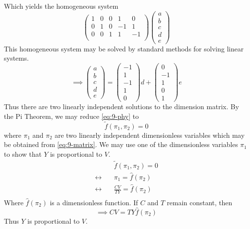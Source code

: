 \documentclass[12pt]{article}
\begin{document}
  Which yields the homogeneous system
  \begin{equation*}
    \begin{pmatrix}
      1 & 0 & 0 & 1 & 0 \\
      0 & 1 & 0 & -1 & 1 \\
      0 & 0 & 1 & 1 & -1 \\
    \end{pmatrix}
    \begin{pmatrix}
      a \\ b \\ c \\ d \\ e
    \end{pmatrix}
  \end{equation*}
  This homogeneous system may be solved by standard methods for solving linear
  systems.
  \begin{equation}
    \label{eq:9-matrix}
    \implies
    \begin{pmatrix}
      a \\ b \\ c \\ d \\ e
    \end{pmatrix}
    =
    \begin{pmatrix}
      -1 \\ 1 \\ -1 \\ 1 \\ 0
    \end{pmatrix}d +
    \begin{pmatrix}
      0 \\ -1 \\ 1 \\ 0 \\ 1
    \end{pmatrix}e
  \end{equation}
  Thus there are two linearly independent solutions to the dimension matrix.
  By the Pi Theorem, we may reduce \cref{eq:9-phy} to
  \begin{equation}
    \tilde{f}(\pi_1, \pi_2) = 0
  \end{equation}
  where $\pi_1$ and $\pi_2$ are two linearly independent dimensionless variables
  which may be obtained from \cref{eq:9-matrix}. We may use one of the
  dimensionless variables $\pi_1$ to show that $Y$ is proportional to $V$.
  \begin{equation*}
    \begin{aligned}
      &\tilde{f}(\pi_1,\pi_2)= 0 \\
      \leftrightarrow\quad& \pi_1 = \hat{f}(\pi_2) \\
      \leftrightarrow\quad& \frac{CV}{TY} = \hat{f}(\pi_2) \\
    \end{aligned}
  \end{equation*}
  Where $\hat{f}(\pi_2)$ is a dimensionless function. If $C$ and $T$ remain
  constant, then
  \begin{equation}
    \label{eq:9-prop}
    \boxed{
      \implies CV = TY\hat{f}(\pi_2)
    }
  \end{equation}
  Thus $Y$ is proportional to $V$.
\end{document}
